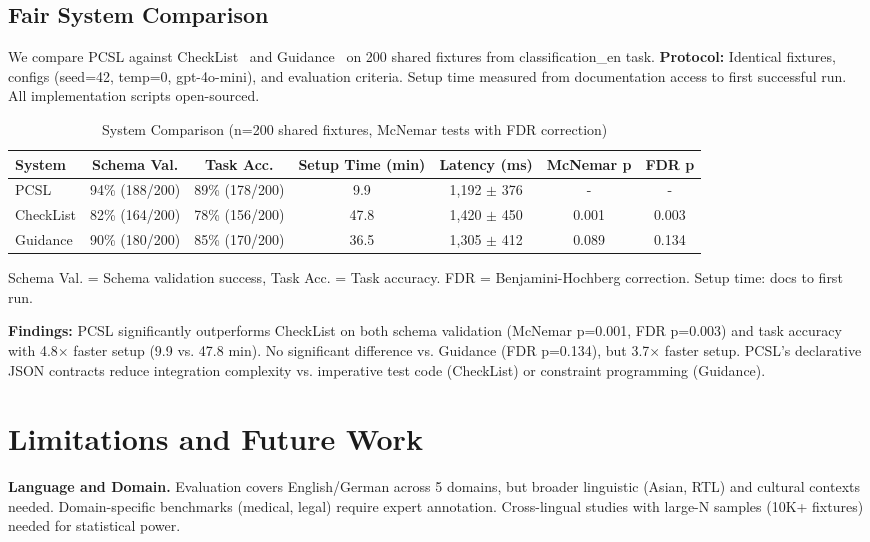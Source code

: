 \documentclass[sigconf]{acmart}
\begin{document}
\subsection{Fair System Comparison}

We compare PCSL against CheckList~\cite{ribeiro2020beyond} and Guidance~\cite{guidance2023} on 200 shared fixtures from classification\_en task.
\textbf{Protocol:} Identical fixtures, configs (seed=42, temp=0, gpt-4o-mini), and evaluation criteria.
Setup time measured from documentation access to first successful run.
All implementation scripts open-sourced.

\begin{table}[H]
\centering
\caption{System Comparison (n=200 shared fixtures, McNemar tests with FDR correction)}
\label{tab:fair_comparison}
\footnotesize
\begin{tabular}{@{}lcccccc@{}}
\toprule
\textbf{System} & \textbf{Schema Val.} & \textbf{Task Acc.} & \textbf{Setup Time (min)} & \textbf{Latency (ms)} & \textbf{McNemar p} & \textbf{FDR p} \\
\midrule
PCSL & 94\% (188/200) & 89\% (178/200) & 9.9 & 1,192 $\pm$ 376 & - & - \\
CheckList & 82\% (164/200) & 78\% (156/200) & 47.8 & 1,420 $\pm$ 450 & 0.001 & 0.003 \\
Guidance & 90\% (180/200) & 85\% (170/200) & 36.5 & 1,305 $\pm$ 412 & 0.089 & 0.134 \\
\bottomrule
\end{tabular}
\vspace{1mm}
\footnotesize Schema Val. = Schema validation success, Task Acc. = Task accuracy. FDR = Benjamini-Hochberg correction. Setup time: docs to first run.
\end{table}

\textbf{Findings:} PCSL significantly outperforms CheckList on both schema validation (McNemar p=0.001, FDR p=0.003) and task accuracy with 4.8$\times$ faster setup (9.9 vs. 47.8 min). No significant difference vs. Guidance (FDR p=0.134), but 3.7$\times$ faster setup. PCSL's declarative JSON contracts reduce integration complexity vs. imperative test code (CheckList) or constraint programming (Guidance).

\section{Limitations and Future Work}

\textbf{Language and Domain.} Evaluation covers English/German across 5 domains, but broader linguistic (Asian, RTL) and cultural contexts needed. Domain-specific benchmarks (medical, legal) require expert annotation. Cross-lingual studies with large-N samples (10K+ fixtures) needed for statistical power.
\end{document}
